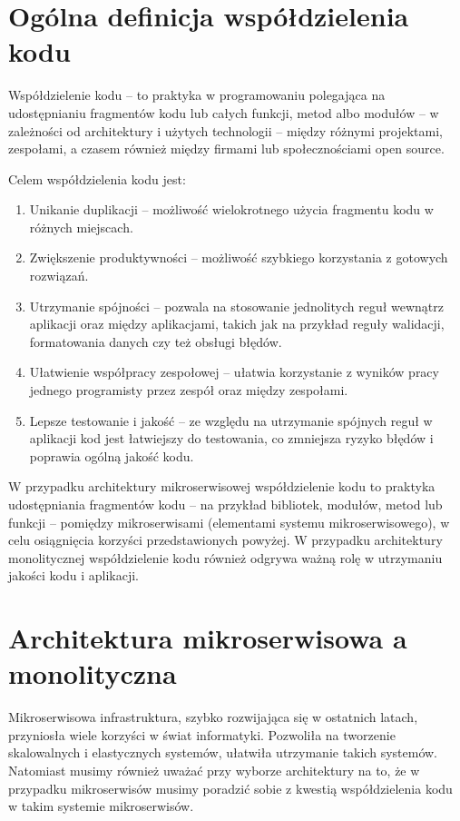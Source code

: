 \documentclass[runningheads,12pt]{llncs}
\begin{document}
\newpage

\section{Ogólna definicja współdzielenia kodu}

Współdzielenie kodu – to praktyka w programowaniu polegająca na udostępnianiu fragmentów kodu lub całych funkcji, metod albo modułów – w zależności od architektury i użytych technologii – między różnymi projektami, zespołami, a czasem również między firmami lub społecznościami open source.

Celem współdzielenia kodu jest:

\begin{enumerate}
    \item Unikanie duplikacji – możliwość wielokrotnego użycia fragmentu kodu w różnych miejscach.
    \item Zwiększenie produktywności – możliwość szybkiego korzystania z gotowych rozwiązań.
    \item Utrzymanie spójności – pozwala na stosowanie jednolitych reguł wewnątrz aplikacji oraz między aplikacjami, takich jak na przykład reguły walidacji, formatowania danych czy też obsługi błędów.
    \item Ułatwienie współpracy zespołowej – ułatwia korzystanie z wyników pracy jednego programisty przez zespół oraz między zespołami.
    \item Lepsze testowanie i jakość – ze względu na utrzymanie spójnych reguł w aplikacji kod jest łatwiejszy do testowania, co zmniejsza ryzyko błędów i poprawia ogólną jakość kodu.
\end{enumerate}

W przypadku architektury mikroserwisowej współdzielenie kodu to praktyka udostępniania fragmentów kodu – na przykład bibliotek, modułów, metod lub funkcji – pomiędzy mikroserwisami (elementami systemu mikroserwisowego), w celu osiągnięcia korzyści przedstawionych powyżej. W przypadku architektury monolitycznej współdzielenie kodu również odgrywa ważną rolę w utrzymaniu jakości kodu i aplikacji.

\section{Architektura mikroserwisowa a monolityczna}

Mikroserwisowa infrastruktura, szybko rozwijająca się w ostatnich latach, przyniosła wiele korzyści w świat informatyki. Pozwoliła na tworzenie skalowalnych i elastycznych systemów, ułatwiła utrzymanie takich systemów. Natomiast musimy również uważać przy wyborze architektury na to, że w przypadku mikroserwisów musimy poradzić sobie z kwestią współdzielenia kodu w takim systemie mikroserwisów.
\end{document}
